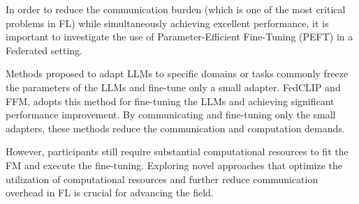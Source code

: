 \documentclass[withindex,glossary]{cam-thesis}
\begin{document}
In order to reduce the communication burden (which is one of the most critical problems in FL) while simultaneously achieving excellent performance, it is important to investigate the use of Parameter-Efficient Fine-Tuning (PEFT) in a Federated setting.

Methods proposed to adapt LLMs to specific domains or tasks commonly freeze the parameters of the LLMs and fine-tune only a small adapter. FedCLIP and FFM, adopts this method for fine-tuning the LLMs and achieving significant performance improvement. By communicating and fine-tuning only the small adapters, these methods reduce the communication and computation demands.

However, participants still require substantial computational resources to fit the FM and execute the fine-tuning. Exploring novel approaches that optimize the utilization of computational resources and further reduce communication overhead in FL is crucial for advancing the field.


\end{document}
